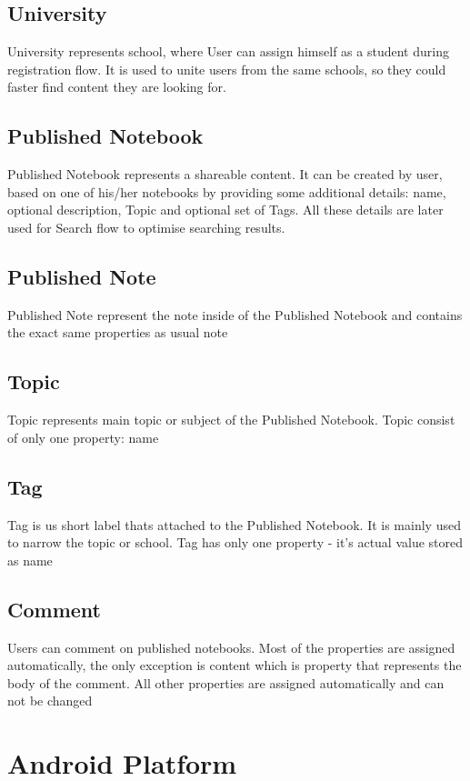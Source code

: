 \documentclass[thesis=B,english]{FITthesis}[2012/10/20]
\begin{document}
	
\subsection{University}
University represents school, where User can assign himself as a student during registration flow. It is used to unite users from the same schools, so they could faster find content they are looking for.

\subsection{Published Notebook}
Published Notebook represents a shareable content. It can be created by user, based on one of his/her notebooks by providing some additional details:
name, optional description,  Topic and optional set of Tags. All these details are later used for Search flow to optimise searching results.

\subsection{Published Note}
Published Note represent the note inside of the Published Notebook and  contains the exact same properties as usual note

\subsection{Topic}
Topic represents main topic or subject of the Published Notebook. Topic consist of only one property: name
\subsection{Tag}
Tag is us short label thats attached to the Published Notebook. It is mainly  used to narrow the topic or school. Tag has only one property - it's actual value stored as name

\subsection{Comment}
Users can comment on published notebooks. Most of the properties are assigned automatically, the only exception is content which is property that represents the body of the comment. All other properties are assigned automatically and can not be changed

\section{Android Platform}
\end{document}

